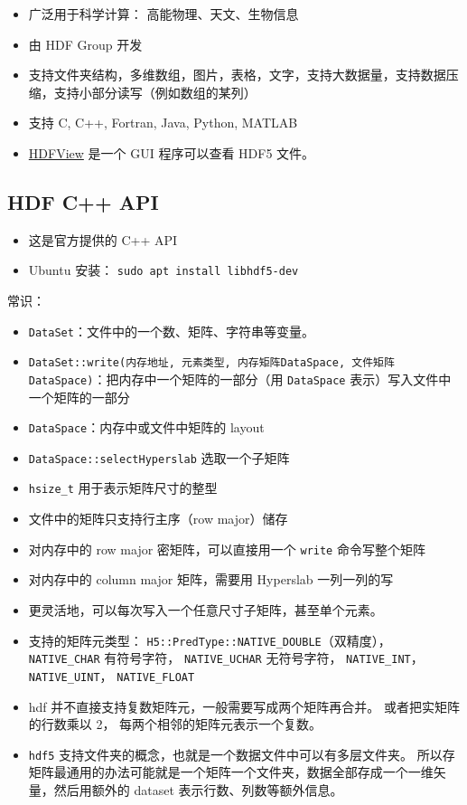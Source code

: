 

\begin{issues}
\issueDraft
\end{issues}

\begin{itemize}
\item 广泛用于科学计算： 高能物理、天文、生物信息
\item 由 HDF Group 开发
\item 支持文件夹结构，多维数组，图片，表格，文字，支持大数据量，支持数据压缩，支持小部分读写（例如数组的某列）
\item 支持 C, C++, Fortran, Java, Python, MATLAB
\item \href{https://www.hdfgroup.org/downloads/hdfview/}{HDFView} 是一个 GUI 程序可以查看 HDF5 文件。
\end{itemize}

\subsection{HDF C++ API}
\begin{itemize}
\item 这是官方提供的 C++ API
\item Ubuntu 安装： \verb`sudo apt install libhdf5-dev`
\end{itemize}

常识：
\begin{itemize}
\item \verb`DataSet`：文件中的一个数、矩阵、字符串等变量。
\item \verb`DataSet::write(内存地址, 元素类型, 内存矩阵DataSpace, 文件矩阵DataSpace)`：把内存中一个矩阵的一部分（用 \verb`DataSpace` 表示）写入文件中一个矩阵的一部分
\item \verb`DataSpace`：内存中或文件中矩阵的 layout
\item \verb`DataSpace::selectHyperslab` 选取一个子矩阵
\item \verb`hsize_t` 用于表示矩阵尺寸的整型
\item 文件中的矩阵只支持行主序（row major）储存
\item 对内存中的 row major 密矩阵，可以直接用一个 \verb`write` 命令写整个矩阵
\item 对内存中的 column major 矩阵，需要用 Hyperslab 一列一列的写
\item 更灵活地，可以每次写入一个任意尺寸子矩阵，甚至单个元素。
\item 支持的矩阵元类型： \verb`H5::PredType::NATIVE_DOUBLE`（双精度）， \verb`NATIVE_CHAR` 有符号字符， \verb`NATIVE_UCHAR` 无符号字符， \verb`NATIVE_INT`， \verb`NATIVE_UINT`， \verb`NATIVE_FLOAT`
\item hdf 并不直接支持复数矩阵元，一般需要写成两个矩阵再合并。 或者把实矩阵的行数乘以 2， 每两个相邻的矩阵元表示一个复数。
\item \verb`hdf5` 支持文件夹的概念，也就是一个数据文件中可以有多层文件夹。 所以存矩阵最通用的办法可能就是一个矩阵一个文件夹，数据全部存成一个一维矢量，然后用额外的 dataset 表示行数、列数等额外信息。
\end{itemize}


